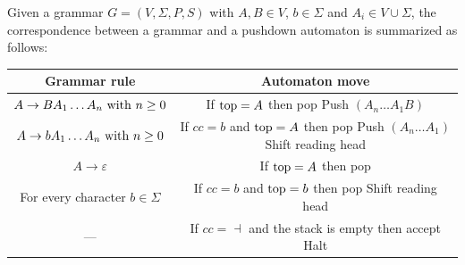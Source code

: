 Given a grammar $G=(V,\Sigma,P,S)$ with $A,B \in V$, $b \in \Sigma$ and $A_i \in V \cup \Sigma$, the correspondence between a grammar and a pushdown automaton is summarized as follows: 
\begin{table}[H]
    \centering
    \begin{tabular}{|cc|}
    \hline
    \textbf{Grammar rule}                                      & \textbf{Automaton move}                                                                                    \\ \hline
    $A \rightarrow B A_1\dots A_n \textnormal{ with }n \geq 0$ & \makecell{If $\textnormal{top}=A$ then pop \\ Push $(A_n \dots A_1B)$}                                     \\ \hline
    $A \rightarrow b A_1\dots A_n \textnormal{ with }n \geq 0$ & \makecell{If $cc=b$ and $\textnormal{top}=A$ then pop \\ Push $(A_n \dots A_1)$ \\ Shift reading head}     \\ \hline
    $A \rightarrow \varepsilon$                                & If $\textnormal{top}=A$ then pop                                                                           \\ \hline
    For every character $b \in \Sigma$                         & \makecell{If $cc=b$ and $\textnormal{top}=b$ then pop \\ Shift reading head}                               \\ \hline
    ---                                                        & \makecell{If $cc=\dashv$ and the stack is empty then accept \\ Halt}                                       \\ \hline
    \end{tabular}
\end{table}
